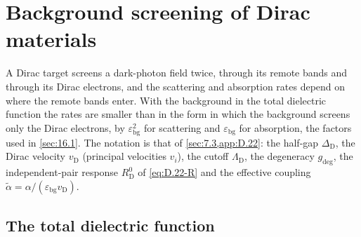 \section{Background screening of Dirac materials}\label{app:D.41}

A Dirac target screens a dark-photon field twice, through its remote bands and through its Dirac electrons, and the scattering and absorption rates depend on where the remote bands enter. With the background in the total dielectric function the rates are smaller than in the form in which the background screens only the Dirac electrons, by $\varepsilon_{\mathrm{bg}}^2$ for scattering and $\varepsilon_{\mathrm{bg}}$ for absorption, the factors used in \cref{sec:16.1}. The notation is that of \cref{sec:7.3,app:D.22}: the half-gap $\Delta_{\mathrm{D}}$, the Dirac velocity $v_{\mathrm{D}}$ (principal velocities $v_i$), the cutoff $\Lambda_{\mathrm{D}}$, the degeneracy $g_{\mathrm{deg}}$, the independent-pair response $R^0_{\mathrm{D}}$ of \cref{eq:D.22-R} and the effective coupling $\tilde\alpha = \alpha/(\varepsilon_{\mathrm{bg}}v_{\mathrm{D}})$.

\subsection*{The total dielectric function}

